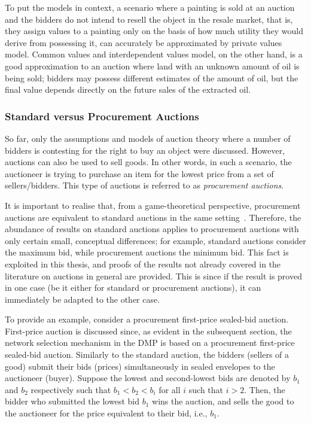 To put the models in context, a scenario where a painting is sold at an auction and the bidders do not intend to resell the object in the resale market, that is, they assign values to a painting only on the basis of how much utility they would derive from possessing it, can accurately be approximated by private values model. Common values and interdependent values model, on the other hand, is a good approximation to an auction where land with an unknown amount of oil is being sold; bidders may possess different estimates of the amount of oil, but the final value depends directly on the future sales of the extracted oil.

\subsubsection{Standard versus Procurement Auctions} %
\label{ssub:standard_versus_procurement_auctions_dmp}
So far, only the assumptions and models of auction theory where a number of bidders is contesting for the right to buy an object were discussed. However, auctions can also be used to sell goods. In other words, in such a scenario, the auctioneer is trying to purchase an item for the lowest price from a set of sellers/bidders. This type of auctions is referred to as \emph{procurement auctions}.

It is important to realise that, from a game-theoretical perspective, procurement auctions are equivalent to standard auctions in the same setting~\cite{Krishna10}. Therefore, the abundance of results on standard auctions applies to procurement auctions with only certain small, conceptual differences; for example, standard auctions consider the maximum bid, while procurement auctions the minimum bid. This fact is exploited in this thesis, and proofs of the results not already covered in the literature on auctions in general are provided. This is since if the result is proved in one case (be it either for standard or procurement auctions), it can immediately be adapted to the other case.

To provide an example, consider a procurement first-price sealed-bid auction. First-price auction is discussed since, as evident in the subsequent section, the network selection mechanism in the DMP is based on a procurement first-price sealed-bid auction. Similarly to the standard auction, the bidders (sellers of a good) submit their bids (prices) simultaneously in sealed envelopes to the auctioneer (buyer). Suppose the lowest and second-lowest bids are denoted by $b_1$ and $b_2$ respectively such that $b_1 < b_2 < b_i$ for all $i$ such that $i > 2$. Then, the bidder who submitted the lowest bid $b_1$ wins the auction, and sells the good to the auctioneer for the price equivalent to their bid, i.e., $b_1$.

